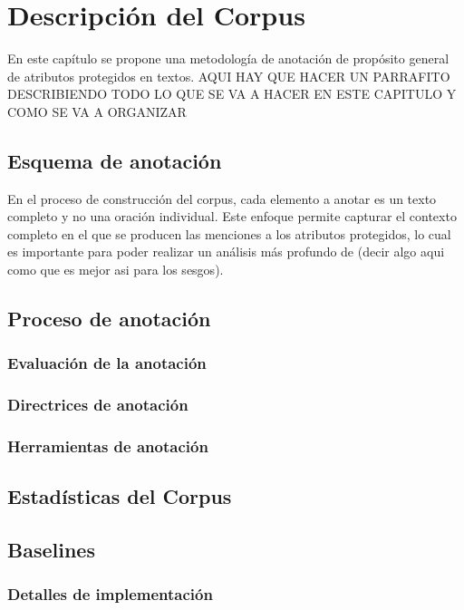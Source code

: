 \chapter{Descripci\'on del Corpus}\label{chapter:proposal}
En este cap\'itulo se propone una metodolog\'ia de anotaci\'on de prop\'osito general de atributos protegidos
en textos. 
AQUI HAY QUE HACER UN PARRAFITO DESCRIBIENDO TODO LO QUE SE VA A HACER EN ESTE CAPITULO Y COMO SE VA A ORGANIZAR

\section{Esquema de anotaci\'on}
En el proceso de construcci\'on del corpus, cada elemento a anotar es un texto completo y no una oraci\'on individual. 
Este enfoque permite capturar el contexto completo en el que se producen las menciones a los atributos protegidos, 
lo cual es importante para poder realizar un an\'alisis m\'as profundo de (decir algo aqui como que es mejor asi para los sesgos).

\section{Proceso de anotaci\'on}

\subsection{Evaluaci\'on de la anotaci\'on}

\subsection{Directrices de anotaci\'on}

\subsection{Herramientas de anotaci\'on}


\section{Estad\'isticas del Corpus}

\section{Baselines}

\subsection{Detalles de implementaci\'on}

